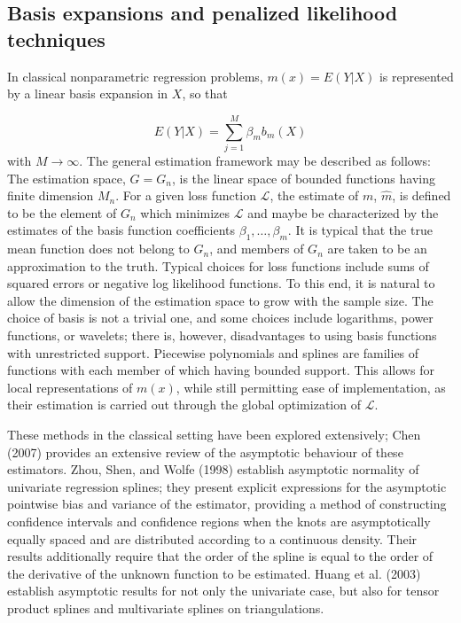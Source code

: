 \documentclass[12pt]{article}
\begin{document}
{\subsection{Basis expansions and penalized likelihood techniques} \label{VC_spline_models}

In classical nonparametric regression problems, $m\left(x\right) = E\left(Y\vert X\right)$ is represented by a linear basis expansion in $X$, so that

\[
E\left(Y \vert X\right) = \sum_{j=1}^M \beta_m b_m\left(X\right)
\]
\noindent
with $M \rightarrow \infty$. The general estimation framework may be described as follows: The estimation space, $G = G_n$, is the linear space of bounded functions having finite dimension $M_n$. For a given loss function $\mathcal{L}$, the estimate of $m$, $\hat{m}$, is defined to be the element of $G_n$ which minimizes $\mathcal{L}$ and maybe be characterized by the estimates of the basis function coefficients $\beta_1,\dots, \beta_m$. It is typical that the true mean function does not belong to $G_n$, and members of $G_n$ are taken to be an approximation to the truth. Typical choices for loss functions include sums of squared errors or negative log likelihood functions. To this end, it is natural to allow the dimension of the estimation space to grow with the sample size. The choice of basis is not a trivial one, and some choices include logarithms, power functions, or wavelets; there is, however, disadvantages to using basis functions with unrestricted support. Piecewise polynomials and splines are families of functions with each member of which having bounded support. This allows for local representations of $m\left(x\right)$, while still permitting ease of implementation, as their estimation is carried out through the global optimization of $\mathcal{L}$. 

These methods in the classical setting have been explored extensively; Chen (2007) provides an extensive review of the asymptotic behaviour of these estimators. Zhou, Shen, and Wolfe (1998) establish asymptotic normality of univariate regression splines; they present explicit expressions for the asymptotic pointwise bias and variance of the estimator, providing a method of constructing confidence intervals and confidence regions when the knots are asymptotically equally spaced and are distributed according to a continuous density. Their results additionally require that the order of the spline is equal to the order of the derivative of the unknown function to be estimated. Huang et al. (2003) establish asymptotic results for not only the univariate case, but also for tensor product splines and multivariate splines on triangulations.  

}
\end{document}
